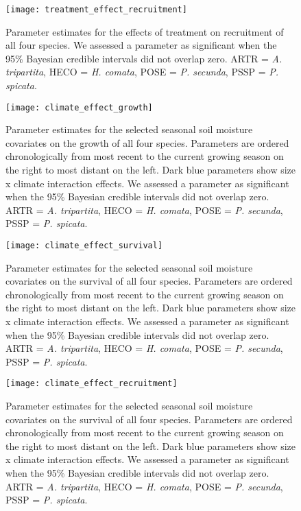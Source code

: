 \documentclass[11pt]{article}
\begin{document}
\begin{figure}[!htbp]
	\centering
	\texttt{[image: treatment\_effect\_recruitment]}
	\caption{Parameter estimates for the effects of treatment on recruitment of all four species. We assessed a parameter as significant when the 95\% Bayesian credible intervals did not overlap zero.  ARTR = \textit{A. tripartita}, HECO = \textit{H. comata}, POSE = \textit{P. secunda}, PSSP = \textit{P. spicata}. }
	\label{fig:recruitmentTreat}
\end{figure}

\begin{figure}[!htbp]
	\centering
	\texttt{[image: climate\_effect\_growth]}
	\caption{Parameter estimates for the selected seasonal soil moisture covariates on the growth of all four species. Parameters are ordered chronologically from most recent to the current growing season on the right to most distant on the left. Dark blue parameters show size x climate interaction effects. We assessed a parameter as significant when the 95\% Bayesian credible intervals did not overlap zero.  ARTR = \textit{A. tripartita}, HECO = \textit{H. comata}, POSE = \textit{P. secunda}, PSSP = \textit{P. spicata}. }
	\label{fig:climateGrowth}
\end{figure}

\begin{figure}[!htbp]
	\centering
	\texttt{[image: climate\_effect\_survival]}
	\caption{Parameter estimates for the selected seasonal soil moisture covariates on the survival of all four species. Parameters are ordered chronologically from most recent to the current growing season on the right to most distant on the left. Dark blue parameters show size x climate interaction effects. We assessed a parameter as significant when the 95\% Bayesian credible intervals did not overlap zero.  ARTR = \textit{A. tripartita}, HECO = \textit{H. comata}, POSE = \textit{P. secunda}, PSSP = \textit{P. spicata}. }
	\label{fig:climateSurvival}
\end{figure}


\begin{figure}[!htbp]
	\centering
	\texttt{[image: climate\_effect\_recruitment]}
	\caption{Parameter estimates for the selected seasonal soil moisture covariates on the survival of all four species. Parameters are ordered chronologically from most recent to the current growing season on the right to most distant on the left. Dark blue parameters show size x climate interaction effects. We assessed a parameter as significant when the 95\% Bayesian credible intervals did not overlap zero.  ARTR = \textit{A. tripartita}, HECO = \textit{H. comata}, POSE = \textit{P. secunda}, PSSP = \textit{P. spicata}. }
	\label{fig:climateRecruitment}
\end{figure}
\end{document}
